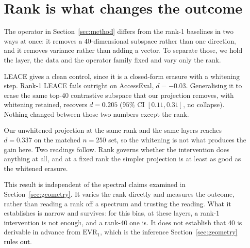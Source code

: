 \section{Rank is what changes the outcome}
\label{sec:rank}

The operator in Section~\ref{sec:method} differs from the rank-1 baselines in two ways
at once: it removes a 40-dimensional subspace rather than one direction, and it removes
variance rather than adding a vector. To separate those, we hold the layer, the data and
the operator family fixed and vary only the rank.

LEACE \citep{belrose2023leace} gives a clean control, since it is a closed-form erasure
with a whitening step. Rank-1 LEACE fails outright on AccessEval, $d{=}{-}0.03$.
Generalising it to erase the same top-40 contrastive subspace that our projection
removes, with whitening retained, recovers $d{=}0.205$ ($95\%$ CI $[0.11, 0.31]$, no
collapse). Nothing changed between those two numbers except the rank.

Our unwhitened projection at the same rank and the same layers reaches $d{=}0.337$ on
the matched $n{=}250$ set, so the whitening is not what produces the gain here. Two
readings follow. Rank governs whether the intervention does anything at all, and at a
fixed rank the simpler projection is at least as good as the whitened erasure.

This result is independent of the spectral claims examined in
Section~\ref{sec:geometry}. It varies the rank directly and measures the outcome, rather
than reading a rank off a spectrum and trusting the reading. What it establishes is
narrow and survives: for this bias, at these layers, a rank-1 intervention is not enough,
and a rank-40 one is. It does not establish that 40 is derivable in advance from
$\mathrm{EVR}_1$, which is the inference Section~\ref{sec:geometry} rules out.
